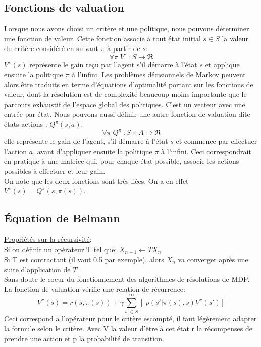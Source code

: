 \documentclass{article}
\begin{document}
\subsection{Fonctions de valuation}
Lorsque nous avons choisi un critère et une politique, nous pouvons déterminer une fonction de valeur. Cette fonction associe à tout état initial $s \in S$ la valeur du critère considéré en suivant $ \pi $ à partir de $ s $:
$$   \forall \pi \; V ^\pi \: : S \mapsto \Re  $$
$V^{\pi }(s) $ représente le gain reçu par l'agent s'il démarre à l'état $ s $ et applique ensuite la politique $\pi$  à l'infini. Les problèmes décisionnels de Markov peuvent alors être traduits en terme d’équations d’optimalité portant sur les fonctions de valeur, dont la résolution est de complexité beaucoup moins importante que le parcours exhaustif de l’espace global des politiques. C'est un vecteur avec une entrée par état.
Nous pouvons aussi définir une autre fonction de valuation dite états-actions : $ Q^\pi (s,a) $:
$$   \forall \pi \; Q ^\pi \: : S \times A \mapsto \Re  $$
elle représente le gain de l'agent, s'il démarre à l'état $s$ et commence par effectuer l'action $a$, avant d'appliquer ensuite la politique $\pi$  à l'infini. Ceci correspondrait en pratique à une matrice qui, pour chaque état possible, associe les actions possibles à effectuer et leur gain. \\
On note que les deux fonctions sont très liées. On a en effet $ V^\pi (s) = Q^{\pi } (s,\pi (s)) $.


\subsection{Équation de Belmann}

\noindent \underline{Propriétés sur la récursivité}: \\
Si on définit un opérateur T tel que: $ X_{n+1} \leftarrow T X_n $ \\
Si T est contractant (il vaut 0.5 par exemple), alors $X_n$ va converger après une suite d'application de $T$. \\

Sans doute le coeur du fonctionnement des algorithmes de résolutions de MDP. La fonction de valuation vérifie une relation de récurrence:
$$ V^\pi (s) =  r(s,\pi(s)) + \gamma \sum_{s' \in S}^{\infty} [ \; p(s'|\pi(s),s)  V^\pi(s')  ] $$
Ceci correspond a l'opérateur pour le critère escompté, il faut légèrement adapter la formule selon le critère.
\noindent Avec V la valeur d'être à cet état r la récompenses de prendre une action et p la probabilité de transition.  \\
\end{document}
